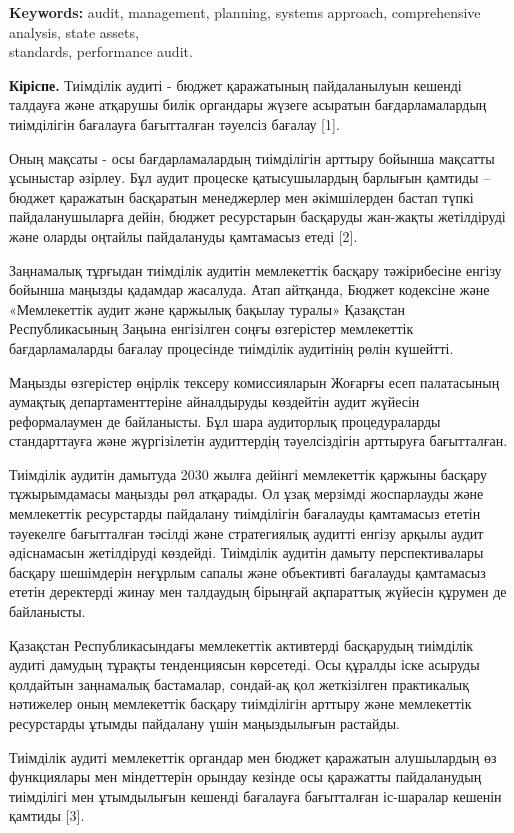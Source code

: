 {\bfseries Keywords:} audit, management, planning, systems approach,
comprehensive analysis, state assets, \\standards, performance audit.

\begin{multicols}{2}
{\bfseries Кіріспе.} Тиімділік аудиті - бюджет қаражатының пайдаланылуын
кешенді талдауға және атқарушы билік органдары жүзеге асыратын
бағдарламалардың тиімділігін бағалауға бағытталған тәуелсіз бағалау
{[}1{]}.

Оның мақсаты - осы бағдарламалардың тиімділігін арттыру бойынша мақсатты
ұсыныстар әзірлеу. Бұл аудит процеске қатысушылардың барлығын қамтиды --
бюджет қаражатын басқаратын менеджерлер мен әкімшілерден бастап түпкі
пайдаланушыларға дейін, бюджет ресурстарын басқаруды жан-жақты
жетілдіруді және оларды оңтайлы пайдалануды қамтамасыз етеді {[}2{]}.

Заңнамалық тұрғыдан тиімділік аудитін мемлекеттік басқару тәжірибесіне
енгізу бойынша маңызды қадамдар жасалуда. Атап айтқанда, Бюджет
кодексіне және «Мемлекеттік аудит және қаржылық бақылау туралы»
Қазақстан Республикасының Заңына енгізілген соңғы өзгерістер мемлекеттік
бағдарламаларды бағалау процесінде тиімділік аудитінің рөлін күшейтті.

Маңызды өзгерістер өңірлік тексеру комиссияларын Жоғарғы есеп
палатасының аумақтық департаменттеріне айналдыруды көздейтін аудит
жүйесін реформалаумен де байланысты. Бұл шара аудиторлық процедураларды
стандарттауға және жүргізілетін аудиттердің тәуелсіздігін арттыруға
бағытталған.

Тиімділік аудитін дамытуда 2030 жылға дейінгі мемлекеттік қаржыны
басқару тұжырымдамасы маңызды рөл атқарады. Ол ұзақ мерзімді жоспарлауды
және мемлекеттік ресурстарды пайдалану тиімділігін бағалауды қамтамасыз
ететін тәуекелге бағытталған тәсілді және стратегиялық аудитті енгізу
арқылы аудит әдіснамасын жетілдіруді көздейді. Тиімділік аудитін дамыту
перспективалары басқару шешімдерін неғұрлым сапалы және объективті
бағалауды қамтамасыз ететін деректерді жинау мен талдаудың бірыңғай
ақпараттық жүйесін құрумен де байланысты.

Қазақстан Республикасындағы мемлекеттік активтерді басқарудың тиімділік
аудиті дамудың тұрақты тенденциясын көрсетеді. Осы құралды іске асыруды
қолдайтын заңнамалық бастамалар, сондай-ақ қол жеткізілген практикалық
нәтижелер оның мемлекеттік басқару тиімділігін арттыру және мемлекеттік
ресурстарды ұтымды пайдалану үшін маңыздылығын растайды.

Тиімділік аудиті мемлекеттік органдар мен бюджет қаражатын алушылардың
өз функциялары мен міндеттерін орындау кезінде осы қаражатты
пайдаланудың тиімділігі мен ұтымдылығын кешенді бағалауға бағытталған
іс-шаралар кешенін қамтиды {[}3{]}.


\end{multicols}

